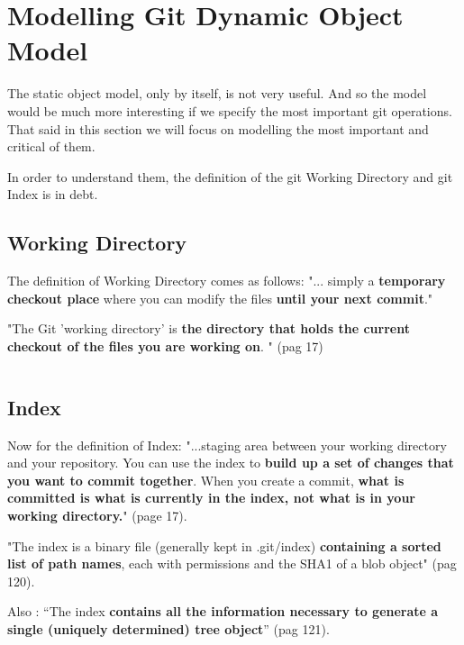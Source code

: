 \section {Modelling Git Dynamic Object Model}
The static object model, only by itself, 
is not very useful. And so
the model would be much more interesting if we specify 
the most important git operations. That said in this
section we will focus on modelling the most important
and critical of them. \par

In order to understand them, the definition
of the git Working Directory and git Index is in debt. \par


\subsection{Working Directory}
The definition of Working Directory comes as follows:
"... simply a {\bf temporary checkout place} where you can 
modify the files {\bf until your next commit}."
\par
"The Git 'working directory' is {\bf the directory that holds 
the current \gls{checkout} of the files you are working on}.
"\cite{gitComm} (pag 17)\par

\begin{lstlisting}

\end{lstlisting}

\subsection{Index}
Now for the definition of Index:
"...staging area between your working directory and your
repository. You can use the index to {\bf build up a set of 
changes that you want to commit together}. When you create
a commit, {\bf what is committed is what is currently in the
index, not what is in your working directory.}"
\cite{gitComm} (page 17). \par

"The index is a binary file (generally kept in .git/index) 
{\bf containing a sorted list of path names}, each with permissions and the
SHA1 of a blob object" \cite{gitComm} (pag 120). 

Also : ``The index {\bf contains all the information necessary to generate a single
(uniquely determined) tree object}'' \cite{gitComm} (pag 121). \par


